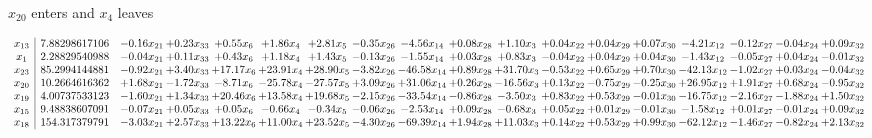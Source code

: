 \documentclass[9pt]{article}
\begin{document}
 $ x_{20} $ enters and $ x_{4} $ leaves 

 \[\begin{array}{c| c c@{\hskip 2pt} c@{\hskip 2pt} c@{\hskip 2pt} c@{\hskip 2pt} c@{\hskip 2pt} c@{\hskip 2pt} c@{\hskip 2pt} c@{\hskip 2pt} c@{\hskip 2pt} c@{\hskip 2pt} c@{\hskip 2pt} c@{\hskip 2pt} c@{\hskip 2pt} c@{\hskip 2pt} c@{\hskip 2pt} c@{\hskip 2pt} }
 x_{13}   &  7.88298617106 & -0.16 x_{21} & +  0.23 x_{33} & +  0.55 x_{6} & +  1.86 x_{4} & +  2.81 x_{5} & -0.35 x_{26} & -4.56 x_{14} & +  0.08 x_{28} & +  1.10 x_{3} & +  0.04 x_{22} & +  0.04 x_{29} & +  0.07 x_{30} & -4.21 x_{12} & -0.12 x_{27} & -0.04 x_{24} & +  0.09 x_{32}\\
 x_{1}   &  2.28829540988 & -0.04 x_{21} & +  0.11 x_{33} & +  0.43 x_{6} & +  1.18 x_{4} & +  1.43 x_{5} & -0.13 x_{26} & -1.55 x_{14} & +  0.03 x_{28} & +  0.83 x_{3} & -0.04 x_{22} & +  0.04 x_{29} & +  0.04 x_{30} & -1.43 x_{12} & -0.05 x_{27} & +  0.04 x_{24} & -0.01 x_{32}\\
 x_{23}   &  85.2994144881 & -0.92 x_{21} & +  3.40 x_{33} & + 17.17 x_{6} & + 23.91 x_{4} & + 28.90 x_{5} & -3.82 x_{26} & -46.58 x_{14} & +  0.89 x_{28} & + 31.70 x_{3} & -0.53 x_{22} & +  0.65 x_{29} & +  0.70 x_{30} & -42.13 x_{12} & -1.02 x_{27} & +  0.03 x_{24} & -0.04 x_{32}\\
 x_{20}   &  10.2664616362 & +  1.68 x_{21} & -1.72 x_{33} & -8.71 x_{6} & -25.78 x_{4} & -27.57 x_{5} & +  3.09 x_{26} & + 31.06 x_{14} & +  0.26 x_{28} & -16.56 x_{3} & +  0.13 x_{22} & -0.75 x_{29} & -0.25 x_{30} & + 26.95 x_{12} & +  1.91 x_{27} & +  0.68 x_{24} & -0.95 x_{32}\\
 x_{19}   &  4.00737533123 & -1.60 x_{21} & +  1.34 x_{33} & + 20.46 x_{6} & + 13.58 x_{4} & + 19.68 x_{5} & -2.15 x_{26} & -33.54 x_{14} & -0.86 x_{28} & -3.50 x_{3} & +  0.83 x_{22} & +  0.53 x_{29} & -0.01 x_{30} & -16.75 x_{12} & -2.16 x_{27} & -1.88 x_{24} & +  1.50 x_{32}\\
 x_{15}   &  9.48838607091 & -0.07 x_{21} & +  0.05 x_{33} & +  0.05 x_{6} & -0.66 x_{4} & -0.34 x_{5} & -0.06 x_{26} & -2.53 x_{14} & +  0.09 x_{28} & -0.68 x_{3} & +  0.05 x_{22} & +  0.01 x_{29} & -0.01 x_{30} & -1.58 x_{12} & +  0.01 x_{27} & -0.01 x_{24} & +  0.09 x_{32}\\
 x_{18}   &  154.317379791 & -3.03 x_{21} & +  2.57 x_{33} & + 13.22 x_{6} & + 11.00 x_{4} & + 23.52 x_{5} & -4.30 x_{26} & -69.39 x_{14} & +  1.94 x_{28} & + 11.03 x_{3} & +  0.14 x_{22} & +  0.53 x_{29} & +  0.99 x_{30} & -62.12 x_{12} & -1.46 x_{27} & -0.82 x_{24} & +  2.13 x_{32}\\

\end{array}\]
\end{document}
